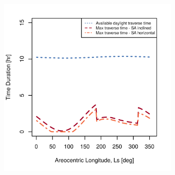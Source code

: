 \begin{figure}[h]
\captionsetup[subfigure]{justification=centering}
\vspace{-2ex}
	\centering
    \setlength{\subfigureWidth}{0.50\textwidth}
    \setlength{\graphicsHeight}{80mm}
    \hypersetup{hidelinks=true}%
    \begin{subfigure}[t]{\subfigureWidth}
        \centering
        \includegraphics[height=\graphicsHeight]{sections/power-system-design/solar-array/plots/ianichaos-75w-max-traverse-durations-for-solar-cell-coverage-area-15m2.png}
		\label{fig:plot:sub:final-maximum-traverse-durations-iani-chaos}
    \end{subfigure}\hfill
    \begin{subfigure}[t]{\subfigureWidth}
        \centering

\end{subfigure}
\end{figure}
